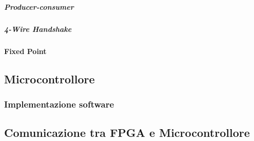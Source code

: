 				\subparagraph{Producer-consumer}
			
				\subparagraph{4-Wire Handshake}
			
			\paragraph{Fixed Point}
	
	\subsection{Microcontrollore}
	
		\subsubsection{Implementazione software}
	
	\subsection{Comunicazione tra FPGA e Microcontrollore}
		
		



